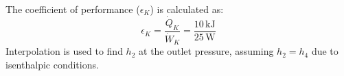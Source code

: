 The coefficient of performance (\( \epsilon_K \)) is calculated as:  
\[
\epsilon_K = \frac{\dot{Q}_K}{\dot{W}_K} = \frac{10 \, \text{kJ}}{25 \, \text{W}}
\]  
Interpolation is used to find \( h_2 \) at the outlet pressure, assuming \( h_2 = h_4 \) due to isenthalpic conditions.